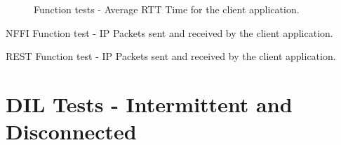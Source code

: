 \begin{landscape}
    \begin{figure}
    \centering
    \begin{floatrow}
    {
    \caption{Function tests - Average RTT Time for the client application.}
    \label{figure:results-function-testsx}
    }
    \end{floatrow}

    \end{figure}
\end{landscape}


\begin{table}[h]

\caption{NFFI Function test - IP Packets sent and received by the client application.}
\label{table:function-test-packets-nffi}
\end{table}

\begin{table}[h]

\caption{REST Function test - IP Packets sent and received by the client application.}
\label{table:function-test-packets-rest}
\end{table}




\section{DIL Tests - Intermittent and Disconnected}

